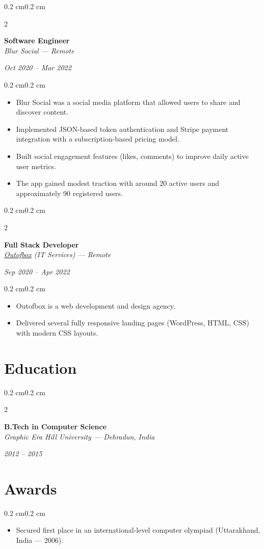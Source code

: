 \documentclass[10pt, letterpaper]{article}
\newenvironment{highlights}{
    \begin{itemize}[
        topsep=0.10 cm,
        parsep=0.10 cm,
        partopsep=0pt,
        itemsep=0pt,
        leftmargin=0.5 cm
    ]
}{
    \end{itemize}
}
\newenvironment{onecolentry}{
    \begin{adjustwidth}{0.2 cm}{0.2 cm}
}{
    \end{adjustwidth}
}
\newenvironment{twocolentry}[2][]{
    \onecolentry
    \def\secondColumn{#2}
    \setcolumnwidth{\fill, 4.5 cm}
    \begin{paracol}{2}
}{
    \switchcolumn \raggedleft \secondColumn
    \end{paracol}
    \endonecolentry
}
\begin{document}
\vspace{0.2cm}

\begin{twocolentry}{\textit{Oct 2020 -- Mar 2022}}
    \textbf{Software Engineer} \\
    \textit{Blur Social — Remote}
\end{twocolentry}
\begin{onecolentry}
\begin{highlights}
    \item Blur Social was a social media platform that allowed users to share and discover content.
    \item Implemented JSON-based token authentication and Stripe payment integration with a subscription-based pricing model.
    \item Built social engagement features (likes, comments) to improve daily active user metrics.
    \item The app gained modest traction with around 20 active users and approximately 90 registered users.
\end{highlights}
\end{onecolentry}

\vspace{0.2cm}

\begin{twocolentry}{\textit{Sep 2020 -- Apr 2022}}
    \textbf{Full Stack Developer} \\
    \textit{\href{https://outofbox.co}{Outofbox}  (IT Services) — Remote}
\end{twocolentry}
\begin{onecolentry}
\begin{highlights}
    \item Outofbox is a web development and design agency.
    \item Delivered several fully responsive landing pages (WordPress, HTML, CSS) with modern CSS layouts.
\end{highlights}
\end{onecolentry}

\section{Education}
\begin{twocolentry}{\textit{2012 -- 2015}}
    \textbf{B.Tech in Computer Science} \\
    \textit{Graphic Era Hill University — Dehradun, India}
\end{twocolentry}

\section{Awards}
\begin{onecolentry}
\begin{highlights}
    \item Secured first place in an international-level computer olympiad (Uttarakhand, India — 2006).
\end{highlights}
\end{onecolentry}
\end{document}
